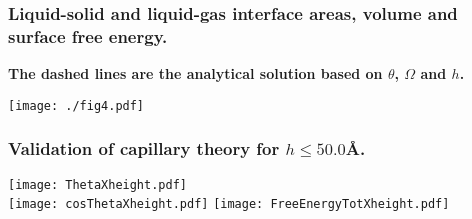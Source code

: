 \documentclass[8pt]{beamer}
\begin{document}
\begin{frame}
	\frametitle{Liquid-solid and liquid-gas interface areas, volume and surface free energy.}
	\begin{center}
		\textbf{The dashed lines are the analytical solution based on $\theta$, $\Omega$ and $h$. }
	\end{center}	
	\begin{center}
		\texttt{[image: ./fig4.pdf]}   
	\end{center}
\end{frame}

\begin{frame}
\frametitle{Validation of capillary theory for $h\leq50.0$\AA.}
	\begin{center}
		\texttt{[image: ThetaXheight.pdf]}\\
		\texttt{[image: cosThetaXheight.pdf]}
		\texttt{[image: FreeEnergyTotXheight.pdf]}\\		
	\end{center}
\end{frame}
\end{document}
